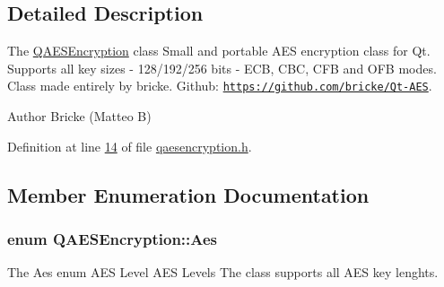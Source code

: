 \subsection{Detailed Description}
The \hyperlink{class_q_a_e_s_encryption}{Q\-A\-E\-S\-Encryption} class Small and portable A\-E\-S encryption class for Qt. Supports all key sizes -\/ 128/192/256 bits -\/ E\-C\-B, C\-B\-C, C\-F\-B and O\-F\-B modes. Class made entirely by bricke. Github\-: \href{https://github.com/bricke/Qt-AES}{\tt https\-://github.\-com/bricke/\-Qt-\/\-A\-E\-S}. 

\begin{DoxyAuthor}{Author}
Bricke (Matteo B) 
\end{DoxyAuthor}


Definition at line \hyperlink{qaesencryption_8h_source_l00014}{14} of file \hyperlink{qaesencryption_8h_source}{qaesencryption.\-h}.



\subsection{Member Enumeration Documentation}
\hypertarget{class_q_a_e_s_encryption_abe48208f4f6c7d68e6a10b49b9d0b7bd}{
\subsubsection[{Aes}]{\setlength{\rightskip}{0pt plus 5cm}enum {\bf Q\-A\-E\-S\-Encryption\-::\-Aes}}}\label{class_q_a_e_s_encryption_abe48208f4f6c7d68e6a10b49b9d0b7bd}


The Aes enum A\-E\-S Level A\-E\-S Levels The class supports all A\-E\-S key lenghts. 

